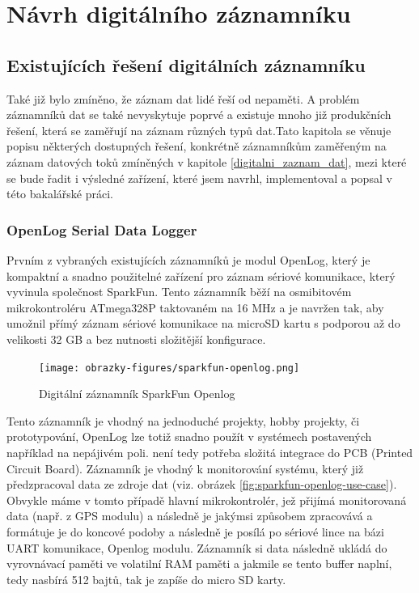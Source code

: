 \chapter{Návrh digitálního záznamníku}


\section{Existujících řešení digitálních záznamníku}
Také již bylo zmíněno, že záznam dat lidé řeší od nepaměti. A problém záznamníků dat se také nevyskytuje poprvé a existuje mnoho již produkčních řešení, která se zaměřují na záznam různých typů dat.Tato kapitola se věnuje popisu některých dostupných řešení, konkrétně záznamníkům zaměřeným na záznam datových toků zmíněných v kapitole \ref{digitalni_zaznam_dat}, mezi které se bude řadit i výsledné zařízení, které jsem navrhl, implementoval a popsal v této bakalářské práci. 


\subsection{OpenLog Serial Data Logger}
\label{openlog_serial_datalogger_module}
Prvním z vybraných existujících záznamníků je modul OpenLog, který je kompaktní a snadno použitelné zařízení pro záznam sériové komunikace, který vyvinula společnost SparkFun. Tento záznamník běží na osmibitovém mikrokontroléru ATmega328P taktovaném na 16 MHz a je navržen tak, aby umožnil přímý záznam sériové komunikace na microSD kartu s podporou až do velikosti 32 GB a bez nutnosti složitější konfigurace. \cite{sparkfun_openlog_tutorial}

\begin{figure}[h]
    \centering
    \texttt{[image: obrazky-figures/sparkfun-openlog.png]}
    
    \caption{Digitální záznamník SparkFun Openlog \cite{cirkit_openlog}}
    \label{fig:sparkfun-openlog}
\end{figure}

Tento záznamník je vhodný na jednoduché projekty, hobby projekty, či prototypování, OpenLog lze totiž snadno použít v systémech postavených například na nepájivém poli. není tedy potřeba složitá integrace do PCB (Printed Circuit Board). Záznamník je vhodný k monitorování systému, který již předzpracoval data ze zdroje dat (viz. obrázek \ref{fig:sparkfun-openlog-use-case}). Obvykle máme v tomto případě hlavní mikrokontrolér, jež přijímá monitorovaná data (např. z GPS modulu) a následně je jakýmsi způsobem zpracovává a formátuje je do koncové podoby a následně je posílá po sériové lince na bázi UART komunikace, Openlog modulu. Záznamník si data následně ukládá do vyrovnávací paměti ve volatilní RAM paměti a jakmile se tento buffer naplní, tedy nasbírá 512 bajtů, tak je zapíše do micro SD karty. \cite{cirkit_openlog}


